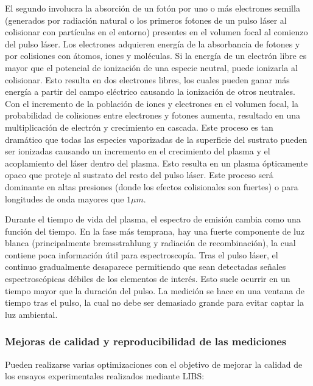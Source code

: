 \documentclass[12pt]{article}
\begin{document}
El segundo involucra la absorción de un fotón por uno o más electrones semilla (generados por radiación natural o los primeros fotones de un pulso láser al colisionar con partículas en el entorno) presentes en el volumen focal al comienzo del pulso láser. Los electrones adquieren energía de la absorbancia de fotones y por colisiones con átomos, iones y moléculas. Si la energía de un electrón libre es mayor que el potencial de ionización de una especie neutral, puede ionizarla al colisionar. Esto resulta en dos electrones libres, los cuales pueden ganar más energía a partir del campo eléctrico causando la ionización de otros neutrales. Con el incremento de la población de iones y electrones en el volumen focal, la probabilidad de colisiones entre electrones y fotones aumenta, resultado en una multiplicación de electrón y crecimiento en cascada. Este proceso es tan dramático que todas las especies vaporizadas de la superficie del sustrato pueden ser ionizadas causando un incremento en el crecimiento del plasma y el acoplamiento del láser dentro del plasma. Esto resulta en un plasma ópticamente opaco que proteje al sustrato del resto del pulso láser. Este proceso será dominante en altas presiones (donde los efectos colisionales son fuertes) o para longitudes de onda mayores que $1 \mu m$.

Durante el tiempo de vida del plasma, el espectro de emisión cambia como una función del tiempo. En la fase más temprana, hay una fuerte componente de luz blanca (principalmente bremsstrahlung y radiación de recombinación), la cual contiene poca información útil para espectroscopía. Tras el pulso láser, el continuo gradualmente desaparece permitiendo que sean detectadas señales espectroscópicas débiles de los elementos de interés. Esto suele ocurrir en un tiempo mayor que la duración del pulso. La medición se hace en una ventana de tiempo tras el pulso, la cual no debe ser demasiado grande para evitar captar la luz ambiental.

\subsubsection{Mejoras de calidad y reproducibilidad de las mediciones}
Pueden realizarse varias optimizaciones con el objetivo de mejorar la calidad de los ensayos experimentales realizados mediante LIBS\cite{LIBS}:
\end{document}
